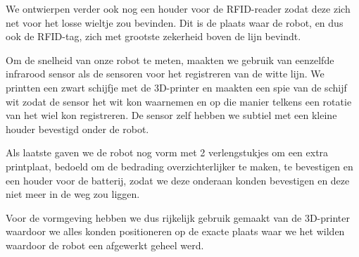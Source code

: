 We ontwierpen verder ook nog een houder voor de RFID-reader zodat deze zich net voor het losse wieltje zou bevinden. Dit is de plaats waar de robot, en dus ook de RFID-tag, zich met grootste zekerheid boven de lijn bevindt.

Om de snelheid van onze robot te meten, maakten we gebruik van eenzelfde infrarood sensor als de sensoren voor het registreren van de witte lijn. We printten een zwart schijfje met de 3D-printer en maakten een spie van de schijf wit zodat de sensor het wit kon waarnemen en op die manier telkens een rotatie van het wiel kon registreren. De sensor zelf hebben we subtiel met een kleine houder bevestigd onder de robot.

Als laatste gaven we de robot nog vorm met 2 verlengstukjes om een extra printplaat, bedoeld om de bedrading overzichterlijker te maken, te bevestigen en een houder voor de batterij, zodat we deze onderaan konden bevestigen en deze niet meer in de weg zou liggen.

Voor de vormgeving hebben we dus rijkelijk gebruik gemaakt van de 3D-printer waardoor we alles konden positioneren op de exacte plaats waar we het wilden waardoor de robot een afgewerkt geheel werd.



 

 
 
 